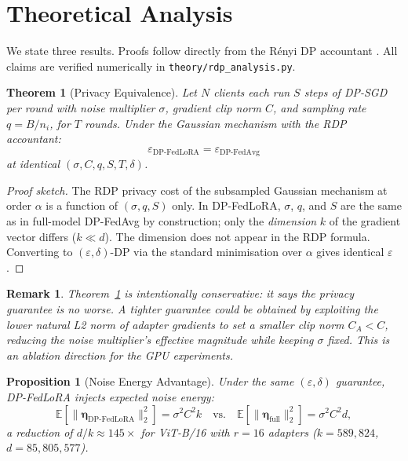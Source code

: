 ﻿\documentclass{article}
\newtheorem{theorem}{Theorem}
\newtheorem{proposition}{Proposition}
\newtheorem{remark}{Remark}
\newcommand{\method}{DP-FedLoRA}
\renewcommand{\eps}{\varepsilon}
\newcommand{\noise}{\sigma}
\newcommand{\clip}{C}
\begin{document}
\section{Theoretical Analysis}
\label{sec:theory}

We state three results.
Proofs follow directly from the Rényi DP accountant
\citep{mironov2017renyi,wang2019subsampled}.
All claims are verified numerically in \texttt{theory/rdp\_analysis.py}.

\begin{theorem}[Privacy Equivalence]
\label{thm:privacy}
Let $N$ clients each run $S$ steps of DP-SGD per round with noise
multiplier $\noise$, gradient clip norm $\clip$, and sampling rate
$q = B/n_i$, for $T$ rounds.
Under the Gaussian mechanism with the RDP accountant:
\[
  \eps_{\text{\method{}}} = \eps_{\text{DP-FedAvg}}
\]
at identical $(\noise, \clip, q, S, T, \delta)$.
\end{theorem}

\begin{proof}[Proof sketch]
The RDP privacy cost of the subsampled Gaussian mechanism at order $\alpha$
is a function of $(\noise, q, S)$ only.
In \method{}, $\noise$, $q$, and $S$ are the same as in full-model
DP-FedAvg by construction; only the \emph{dimension} $k$ of the gradient
vector differs ($k \ll d$).
The dimension does not appear in the RDP formula.
Converting to $(\eps, \delta)$-DP via the standard minimisation over
$\alpha$ gives identical $\eps$.
\end{proof}

\begin{remark}
Theorem~\ref{thm:privacy} is intentionally conservative: it says the privacy
guarantee is \emph{no worse}.
A tighter guarantee could be obtained by exploiting the lower natural L2
norm of adapter gradients to set a smaller clip norm $\clip_A < \clip$,
reducing the noise multiplier's effective magnitude while keeping $\noise$
fixed.
This is an ablation direction for the GPU experiments.
\end{remark}

\begin{proposition}[Noise Energy Advantage]
\label{prop:noise}
Under the same $(\eps, \delta)$ guarantee, \method{} injects expected
noise energy:
\[
  \mathbb{E}[\|\boldsymbol{\eta}_{\text{\method{}}}\|_2^2]
    = \noise^2 \clip^2 k
  \quad \text{vs.} \quad
  \mathbb{E}[\|\boldsymbol{\eta}_{\text{full}}\|_2^2]
    = \noise^2 \clip^2 d,
\]
a reduction of $d/k \approx 145{\times}$ for ViT-B/16 with
$r{=}16$ adapters ($k{=}589{,}824$, $d{=}85{,}805{,}577$).
\end{proposition}
\end{document}
